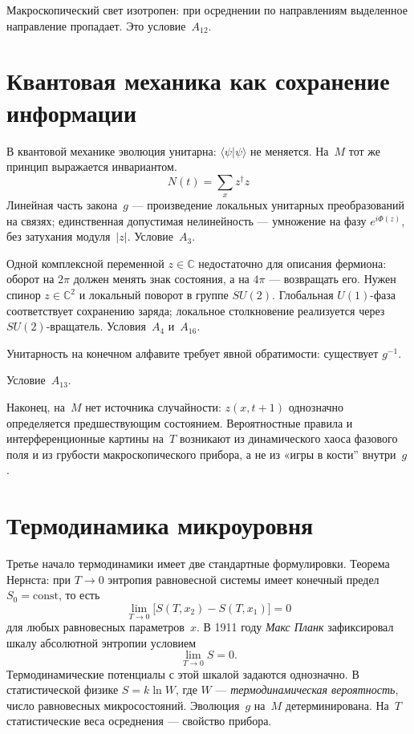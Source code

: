Макроскопический свет изотропен:
при осреднении по направлениям выделенное направление пропадает.
Это условие~$A_{12}$.

\section{Квантовая механика как сохранение информации}

В квантовой механике эволюция унитарна: $\langle\psi|\psi\rangle$ не меняется.
На~$M$ тот же принцип выражается инвариантом.
\[
N(t)=\sum_x z^\dagger z
\]
Линейная часть закона~$g$ --- произведение локальных унитарных преобразований на связях;
единственная допустимая нелинейность --- умножение на фазу $e^{i\Phi(z)}$, без затухания модуля~$|z|$.
Условие~$A_3$.

Одной комплексной переменной $z\in\mathbb{C}$ недостаточно для описания фермиона:
оборот на $2\pi$ должен менять знак состояния, а на $4\pi$ --- возвращать его.
Нужен спинор $z\in\mathbb{C}^2$ и локальный поворот в группе $SU(2)$.
Глобальная $U(1)$-фаза соответствует сохранению заряда; локальное столкновение реализуется
через $SU(2)$-вращатель.
Условия~$A_4$ и~$A_{16}$.

Унитарность на конечном алфавите требует явной обратимости: существует $g^{-1}$.

Условие~$A_{13}$.

Наконец, на~$M$ нет источника случайности: $z(x,t+1)$ однозначно определяется
предшествующим состоянием.
Вероятностные правила и интерференционные картины на~$T$ возникают из динамического хаоса
фазового поля и из грубости макроскопического прибора, а не из «игры в кости'' внутри~$g$
.

\section{Термодинамика микроуровня}

Третье начало термодинамики имеет две стандартные формулировки.
Теорема Нернста: при $T\to 0$ энтропия равновесной системы имеет конечный предел
$S_0=\mathrm{const}$, то есть
\[
  \lim_{T\to 0}\bigl[S(T,x_2)-S(T,x_1)\bigr]=0
\]
для любых равновесных параметров~$x$.
В 1911 году \emph{Макс Планк} зафиксировал шкалу абсолютной энтропии условием
\[
  \lim_{T\to 0} S = 0.
\]
Термодинамические потенциалы с этой шкалой задаются однозначно.
В статистической физике $S=k\ln W$, где $W$ --- \emph{термодинамическая вероятность},
число равновесных микросостояний.
Эволюция~$g$ на~$M$ детерминирована.
На~$T$ статистические веса осреднения --- свойство прибора.

